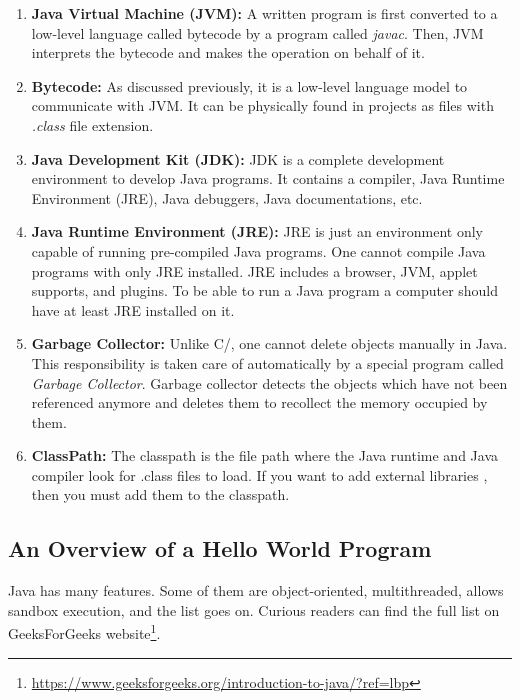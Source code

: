 \begin{enumerate}
    \item \textbf{Java Virtual Machine (JVM):} A written program is first converted to a low-level language called bytecode by a program called \emph{javac}. Then, JVM interprets the bytecode and makes the operation on behalf of it.
    
    \item \textbf{Bytecode:} As discussed previously, it is a low-level language model to communicate with JVM. It can be physically found in projects as files with \emph{.class} file extension.
    
    \item \textbf{Java Development Kit (JDK):} JDK is a complete development environment to develop Java programs. It contains a compiler, Java Runtime Environment (JRE), Java debuggers, Java documentations, etc.
    
    \item \textbf{Java Runtime Environment (JRE):} JRE is just an environment only capable of running pre-compiled Java programs. One cannot compile Java programs with only JRE installed. JRE includes a browser, JVM, applet supports, and plugins. To be able to run a Java program a computer should have at least JRE installed on it.
    
    \item \textbf{Garbage Collector:} Unlike C/\CC, one cannot delete objects manually in Java. This responsibility is taken care of automatically by a special program called \emph{Garbage Collector}. Garbage collector detects the objects which have not been referenced anymore and deletes them to recollect the memory occupied by them.
    
    \item \textbf{ClassPath:} The classpath is the file path where the Java runtime and Java compiler look for .class files to load. If you want to add external libraries , then you must add them to the classpath.
\end{enumerate}

\subsection{An Overview of a Hello World Program}
Java has many features. Some of them are object-oriented, multithreaded, allows sandbox execution, and the list goes on. Curious readers can find the full list on GeeksForGeeks website\footnote{\url{https://www.geeksforgeeks.org/introduction-to-java/?ref=lbp}}.


